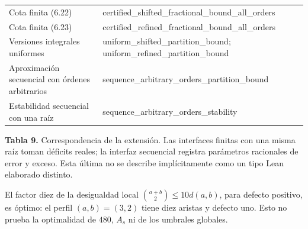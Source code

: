 \documentclass[spanish,11pt,a4paper]{article}
\begin{document}
{\begin{longtable}[c]{@{}
  >{\raggedright\arraybackslash}p{}
  >{\raggedright\arraybackslash}p{}@{}}
Cota finita (6.22) & {\ttfamily\small certified\_\discretionary{\hbox{\ensuremath{\hookrightarrow}}}{}{}shifted\_\discretionary{\hbox{\ensuremath{\hookrightarrow}}}{}{}fractional\_\discretionary{\hbox{\ensuremath{\hookrightarrow}}}{}{}bound\_\discretionary{\hbox{\ensuremath{\hookrightarrow}}}{}{}all\_\discretionary{\hbox{\ensuremath{\hookrightarrow}}}{}{}orders} \\
Cota finita (6.23) & {\ttfamily\small certified\_\discretionary{\hbox{\ensuremath{\hookrightarrow}}}{}{}refined\_\discretionary{\hbox{\ensuremath{\hookrightarrow}}}{}{}fractional\_\discretionary{\hbox{\ensuremath{\hookrightarrow}}}{}{}bound\_\discretionary{\hbox{\ensuremath{\hookrightarrow}}}{}{}all\_\discretionary{\hbox{\ensuremath{\hookrightarrow}}}{}{}orders} \\
Versiones integrales uniformes & {\ttfamily\small uniform\_\discretionary{\hbox{\ensuremath{\hookrightarrow}}}{}{}shifted\_\discretionary{\hbox{\ensuremath{\hookrightarrow}}}{}{}partition\_\discretionary{\hbox{\ensuremath{\hookrightarrow}}}{}{}bound}; {\ttfamily\small uniform\_\discretionary{\hbox{\ensuremath{\hookrightarrow}}}{}{}refined\_\discretionary{\hbox{\ensuremath{\hookrightarrow}}}{}{}partition\_\discretionary{\hbox{\ensuremath{\hookrightarrow}}}{}{}bound} \\
Aproximación secuencial con órdenes arbitrarios & {\ttfamily\small sequence\_\discretionary{\hbox{\ensuremath{\hookrightarrow}}}{}{}arbitrary\_\discretionary{\hbox{\ensuremath{\hookrightarrow}}}{}{}orders\_\discretionary{\hbox{\ensuremath{\hookrightarrow}}}{}{}partition\_\discretionary{\hbox{\ensuremath{\hookrightarrow}}}{}{}bound} \\
Estabilidad secuencial con una raíz & {\ttfamily\small sequence\_\discretionary{\hbox{\ensuremath{\hookrightarrow}}}{}{}arbitrary\_\discretionary{\hbox{\ensuremath{\hookrightarrow}}}{}{}orders\_\discretionary{\hbox{\ensuremath{\hookrightarrow}}}{}{}stability} \\
\end{longtable}
}

\textbf{Tabla 9.} Correspondencia de la extensión. Las interfaces finitas con una misma raíz toman déficits reales; la interfaz secuencial registra parámetros racionales de error y exceso. Esta última no se describe implícitamente como un tipo Lean elaborado distinto.

El factor diez de la desigualdad local \(\binom{a+b}{2}\le10d(a,b)\), para defecto positivo, es óptimo: el perfil \((a,b)=(3,2)\) tiene diez aristas y defecto uno. Esto no prueba la optimalidad de \(480\), \(A_s\) ni de los umbrales globales.
\end{document}
